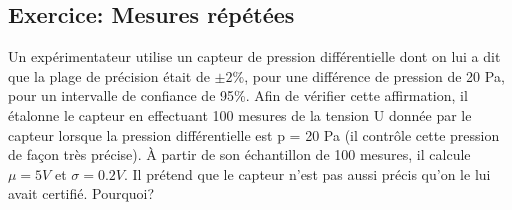\subsection{Exercice: Mesures répétées}

Un expérimentateur utilise un capteur de pression différentielle dont on lui a dit que la plage de précision était de $\pm 2\%$, pour une différence de pression de 20 Pa, pour un intervalle de confiance de 95\%. Afin de vérifier cette affirmation, il étalonne le capteur en effectuant 100 mesures de la tension U donnée par le capteur lorsque la pression différentielle est p = 20 Pa (il contrôle cette pression de façon très précise). À partir de son échantillon de 100 mesures, il calcule $\mu = 5V$ et $\sigma = 0.2 V$. Il prétend que le capteur n'est pas aussi précis qu'on le lui avait certifié. Pourquoi?
